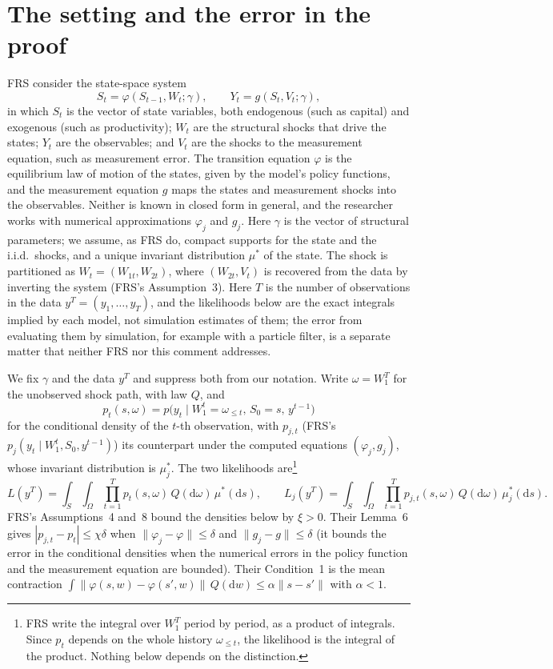 \documentclass[11pt]{article}
\theoremstyle{definition}
\theoremstyle{remark}
\newcommand{\dd}{\mathrm{d}}
\begin{document}
\section{The setting and the error in the proof}\label{sec:error}

FRS consider the state-space system
\[
  S_t = \varphi(S_{t-1}, W_t;\gamma), \qquad Y_t = g(S_t, V_t;\gamma),
\]
in which $S_t$ is the vector of state variables, both endogenous (such as capital) and exogenous
(such as productivity); $W_t$ are the structural shocks that drive the states; $Y_t$ are the
observables; and $V_t$ are the shocks to the measurement equation, such as measurement error. The
transition equation $\varphi$ is the equilibrium law of motion of the states, given by the model's
policy functions, and the measurement equation $g$ maps the states and measurement shocks into the
observables. Neither is known in closed form in general, and the researcher works with numerical
approximations $\varphi_j$ and $g_j$. Here $\gamma$ is the vector of structural parameters; we
assume, as FRS do, compact supports for the state and
the i.i.d.\ shocks, and a unique invariant distribution
$\mu^*$ of the state. The shock is partitioned as $W_t = (W_{1t}, W_{2t})$, where
$(W_{2t}, V_t)$ is recovered from the data by inverting the system (FRS's Assumption~3). Here $T$ is
the number of observations in the data $y^T = (y_1, \ldots, y_T)$, and the likelihoods below are
the exact integrals implied by each model, not simulation estimates of them; the error from
evaluating them by simulation, for example with a particle filter, is a separate matter that
neither FRS nor this comment addresses.

We fix $\gamma$ and the data $y^T$ and suppress both from our notation. Write $\omega = W_1^T$ for the unobserved shock
path, with law $Q$, and
\[
  p_t(s,\omega) = p\bigl(y_t \mid W_1^t = \omega_{\le t},\, S_0 = s,\, y^{t-1}\bigr)
\]
for the conditional density of the $t$-th observation, with $p_{j,t}$ (FRS's
$p_j(y_t \mid W_1^t, S_0, y^{t-1})$) its counterpart under the computed equations $(\varphi_j, g_j)$, whose invariant distribution is $\mu^*_j$. The two
likelihoods are\footnote{FRS write the integral over $W_1^T$ period by period, as a
product of integrals. Since $p_t$ depends on the whole history $\omega_{\le t}$, the likelihood
is the integral of the product. Nothing below depends on the distinction.}
\[
  L(y^T) = \int_S\int_\Omega \prod_{t=1}^T p_t(s,\omega)\, Q(\dd\omega)\,\mu^*(\dd s),
  \qquad
  L_j(y^T) = \int_S\int_\Omega \prod_{t=1}^T p_{j,t}(s,\omega)\, Q(\dd\omega)\,\mu_j^*(\dd s).
\]
FRS's Assumptions~4 and~8 bound the densities below by $\xi > 0$. Their Lemma~6 gives
$|p_{j,t} - p_t| \le \chi\delta$ when $\|\varphi_j - \varphi\| \le \delta$ and
$\|g_j - g\| \le \delta$ (it bounds the error in the conditional densities when the numerical
errors in the policy function and the measurement equation are bounded). Their Condition~1 is the
mean contraction
$\int \|\varphi(s,w) - \varphi(s',w)\|\,Q(\dd w) \le \alpha\|s - s'\|$ with $\alpha < 1$.
\end{document}
